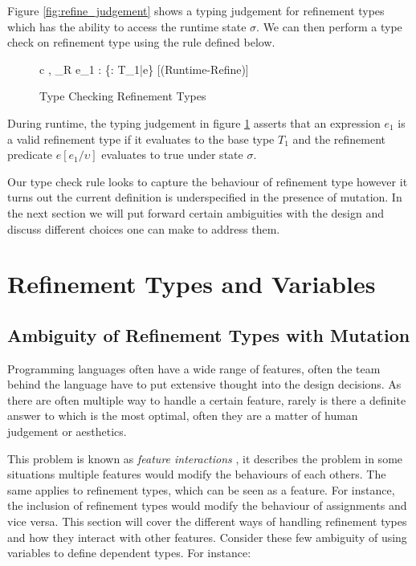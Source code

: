 \documentclass[a4paper,12pt]{report}
\begin{document}
\par
Figure \ref{fig:refine_judgement} shows a typing judgement for refinement 
types which has the ability to access the runtime state $\sigma$. We can then 
perform a type check on refinement type using the rule defined below. 

\begin{figure}[H]
  \begin{center}
    \begin{tabular} {c}
      {\sigma, \Gamma \vdash_{R} e_1 : \{\upsilon : T_1\text{ }|\text{ }e\}} [(Runtime-Refine)]
    \end{tabular}
  \end{center}
  \caption{Type Checking Refinement Types}
  \label{fig:refine_typecheck}
\end{figure}

\par
During runtime, the typing judgement in figure \ref{fig:refine_typecheck} 
asserts that an expression $e_1$ is a valid refinement type if it 
evaluates to the base type $T_1$ and the refinement predicate $e[e_1/\upsilon]$ 
evaluates to true under state $\sigma$.

\par
Our type check rule looks to capture the behaviour of refinement type however it 
turns out the current definition is underspecified in the presence of mutation. 
In the next section we will put forward certain ambiguities with the 
design and discuss different choices one can make to address them.

\section{Refinement Types and Variables}
\subsection{Ambiguity of Refinement Types with Mutation}
Programming languages often have a wide range of features, often the team behind 
the language have to put extensive thought into the design decisions. As there 
are often multiple way to handle a certain feature, rarely is there a definite 
answer to which is the most optimal, often they are a matter of human judgement 
or aesthetics. 

\par
This problem is known as \textit{feature interactions} 
\cite{featInteract}, it describes the problem in some situations multiple 
features would modify the behaviours of each others. The same applies to 
refinement types, which can be seen as a feature. For instance, the inclusion 
of refinement types would modify the behaviour of assignments and vice versa. 
This section will cover the different ways of handling refinement types and how 
they interact with other features.
Consider these few ambiguity of using variables to define dependent types. For 
instance: 
\end{document}
